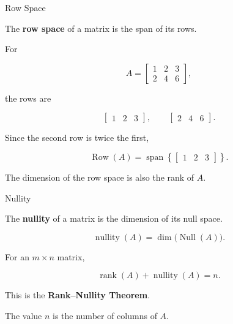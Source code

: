 \begin{frame}{Row Space}

The \textbf{row space} of a matrix is the span of its rows.

For

\[
A=
\begin{bmatrix}
1&2&3\\
2&4&6
\end{bmatrix},
\]

the rows are

\[
\begin{bmatrix}
1&2&3
\end{bmatrix},
\qquad
\begin{bmatrix}
2&4&6
\end{bmatrix}.
\]

Since the second row is twice the first,

\[
\boxed{
\operatorname{Row}(A)
=
\operatorname{span}
\left\{
\begin{bmatrix}
1&2&3
\end{bmatrix}
\right\}.
}
\]

The dimension of the row space is also the rank of $A$.

\end{frame}



\begin{frame}{Nullity}

The \textbf{nullity} of a matrix is the dimension of its
null space.

\[
\boxed{
\operatorname{nullity}(A)
=
\dim\bigl(\operatorname{Null}(A)\bigr).
}
\]

For an $m\times n$ matrix,

\[
\boxed{
\operatorname{rank}(A)
+
\operatorname{nullity}(A)
=
n.
}
\]

This is the \textbf{Rank--Nullity Theorem}.

\vspace{0.4cm}

The value $n$ is the number of columns of $A$.

\end{frame}



